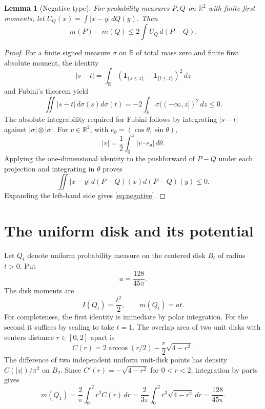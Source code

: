 \documentclass[11pt,a4paper]{amsart}
\newtheorem{lemma}[theorem]{Lemma}
\theoremstyle{remark}
\newcommand{\R}{\mathbb R}
\newcommand{\ind}{\mathbf{1}}
\begin{document}
\begin{lemma}[Negative type]\label{lem:negative}
For probability measures $P,Q$ on $\R^2$ with finite first moments,
let $U_Q(x)=\int |x-y|\,dQ(y)$. Then
\begin{equation}\label{eq:negative}
 m(P)-m(Q)\le 2\int U_Q\,d(P-Q).
\end{equation}
\end{lemma}
\begin{proof}
For a finite signed measure $\sigma$ on $\R$ of total mass zero and
finite first absolute moment, the identity
\[
 |s-t|=\int_{\R}(\ind_{\{s\le z\}}-\ind_{\{t\le z\}})^2\,dz
\]
and Fubini's theorem yield
\[
 \iint |s-t|\,d\sigma(s)d\sigma(t)
 =-2\int_{\R}\sigma(({-\infty},z])^2\,dz\le0.
\]
The absolute integrability required for Fubini follows by integrating
$|s-t|$ against $|\sigma|\otimes|\sigma|$.
For $v\in\R^2$, with $e_\theta=(\cos\theta,\sin\theta)$,
\[
 |v|=\frac12\int_0^\pi |v\cdot e_\theta|\,d\theta.
\]
Applying the one-dimensional identity to the pushforward of $P-Q$
under each projection and integrating in $\theta$ proves
\[
 \iint |x-y|\,d(P-Q)(x)d(P-Q)(y)\le0.
\]
Expanding the left-hand side gives \eqref{eq:negative}.
\end{proof}

\section{The uniform disk and its potential}
Let $Q_t$ denote uniform probability measure on the centered disk
$B_t$ of radius $t>0$. Put
\[
 a=\frac{128}{45\pi}.
\]
The disk moments are
\begin{equation}\label{eq:diskmom}
 I(Q_t)=\frac{t^2}{2},\qquad m(Q_t)=at.
\end{equation}
For completeness, the first identity is immediate by polar integration.
For the second it suffices by scaling to take $t=1$. The overlap area
of two unit disks with centers distance $r\in[0,2]$ apart is
\[
 C(r)=2\arccos(r/2)-\frac r2\sqrt{4-r^2}.
\]
The difference of two independent uniform unit-disk points has density
$C(|z|)/\pi^2$ on $B_2$. Since $C'(r)=-\sqrt{4-r^2}$ for $0<r<2$,
integration by parts gives
\[
 m(Q_1)=\frac2\pi\int_0^2 r^2C(r)\,dr
 =\frac{2}{3\pi}\int_0^2 r^3\sqrt{4-r^2}\,dr
 =\frac{128}{45\pi}.
\]
\end{document}
